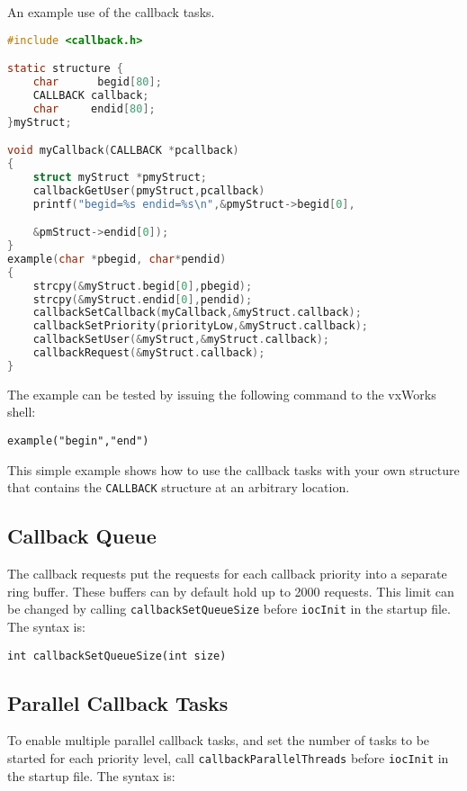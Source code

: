 An example use of the callback tasks.

\begin{lstlisting}[language=C]
#include <callback.h>

static structure {
    char      begid[80];
    CALLBACK callback;
    char     endid[80];
}myStruct;

void myCallback(CALLBACK *pcallback)
{
    struct myStruct *pmyStruct;
    callbackGetUser(pmyStruct,pcallback)
    printf("begid=%s endid=%s\n",&pmyStruct->begid[0],

    &pmStruct->endid[0]);
}
example(char *pbegid, char*pendid)
{
    strcpy(&myStruct.begid[0],pbegid);
    strcpy(&myStruct.endid[0],pendid);
    callbackSetCallback(myCallback,&myStruct.callback);
    callbackSetPriority(priorityLow,&myStruct.callback);
    callbackSetUser(&myStruct,&myStruct.callback);
    callbackRequest(&myStruct.callback);
}
\end{lstlisting}

The example can be tested by issuing the following command to the vxWorks shell:

\begin{verbatim}
example("begin","end")
\end{verbatim}

This simple example shows how to use the callback tasks with your own structure that contains the \verb|CALLBACK| structure 
at an arbitrary location.

\subsection{Callback Queue}

The callback requests put the requests for each callback priority into a separate ring buffer. These buffers can by default 
hold up to 2000 requests. This limit can be changed by calling \verb|callbackSetQueueSize| before \verb|iocInit| in the 
startup file. The syntax is:

\begin{verbatim}
int callbackSetQueueSize(int size)
\end{verbatim}

\subsection{Parallel Callback Tasks}
\label{Parallel Callback Tasks}

To enable multiple parallel callback tasks, and set the number of tasks to be started for each priority level, call
\verb|callbackParallelThreads| before \verb|iocInit| in the startup file. The syntax is:

